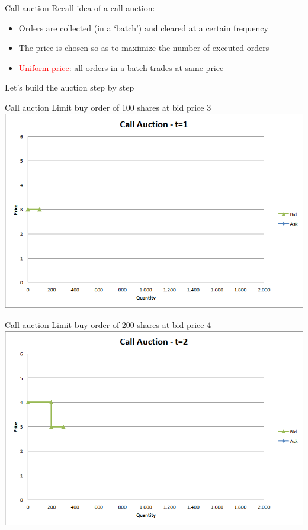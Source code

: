 \documentclass[english,10pt
,aspectratio=169
]{beamer}
\begin{document}
\begin{frame}{Call auction}
	Recall idea of a call auction:
	\begin{itemize}
		\item Orders are collected (in a `batch') and cleared at a certain frequency
		\item The price is chosen so as to maximize the number of executed orders
		\item \textcolor{red}{Uniform price}: all orders in a batch trades at same price
	\end{itemize}
	\quad
	Let's build the auction step by step
\end{frame}


\begin{frame}{Call auction}
	Limit buy order of 100 shares at bid price 3
	\quad
	\center
	\includegraphics[width=.75\linewidth]{pics/ch1/Call_t1}
\end{frame}


\begin{frame}{Call auction}
	Limit buy order of 200 shares at bid price 4
	\quad
	\center
	\includegraphics[width=.75\linewidth]{pics/ch1/Call_t2}
\end{frame}
\end{document}
